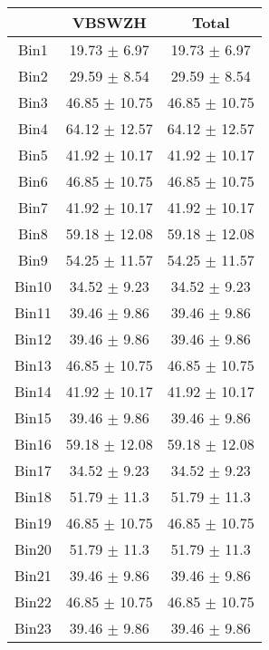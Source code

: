   \begin{tabular}{|c|c|c|}
  \hline
      & VBSWZH & Total \\ \cline{1-3} 
     \hline\hline
     Bin1 & 19.73 $\pm$ 6.97 & 19.73 $\pm$ 6.97 \\ \cline{1-3} 
     Bin2 & 29.59 $\pm$ 8.54 & 29.59 $\pm$ 8.54 \\ \cline{1-3} 
     Bin3 & 46.85 $\pm$ 10.75 & 46.85 $\pm$ 10.75 \\ \cline{1-3} 
     Bin4 & 64.12 $\pm$ 12.57 & 64.12 $\pm$ 12.57 \\ \cline{1-3} 
     Bin5 & 41.92 $\pm$ 10.17 & 41.92 $\pm$ 10.17 \\ \cline{1-3} 
     Bin6 & 46.85 $\pm$ 10.75 & 46.85 $\pm$ 10.75 \\ \cline{1-3} 
     Bin7 & 41.92 $\pm$ 10.17 & 41.92 $\pm$ 10.17 \\ \cline{1-3} 
     Bin8 & 59.18 $\pm$ 12.08 & 59.18 $\pm$ 12.08 \\ \cline{1-3} 
     Bin9 & 54.25 $\pm$ 11.57 & 54.25 $\pm$ 11.57 \\ \cline{1-3} 
     Bin10 & 34.52 $\pm$ 9.23 & 34.52 $\pm$ 9.23 \\ \cline{1-3} 
     Bin11 & 39.46 $\pm$ 9.86 & 39.46 $\pm$ 9.86 \\ \cline{1-3} 
     Bin12 & 39.46 $\pm$ 9.86 & 39.46 $\pm$ 9.86 \\ \cline{1-3} 
     Bin13 & 46.85 $\pm$ 10.75 & 46.85 $\pm$ 10.75 \\ \cline{1-3} 
     Bin14 & 41.92 $\pm$ 10.17 & 41.92 $\pm$ 10.17 \\ \cline{1-3} 
     Bin15 & 39.46 $\pm$ 9.86 & 39.46 $\pm$ 9.86 \\ \cline{1-3} 
     Bin16 & 59.18 $\pm$ 12.08 & 59.18 $\pm$ 12.08 \\ \cline{1-3} 
     Bin17 & 34.52 $\pm$ 9.23 & 34.52 $\pm$ 9.23 \\ \cline{1-3} 
     Bin18 & 51.79 $\pm$ 11.3 & 51.79 $\pm$ 11.3 \\ \cline{1-3} 
     Bin19 & 46.85 $\pm$ 10.75 & 46.85 $\pm$ 10.75 \\ \cline{1-3} 
     Bin20 & 51.79 $\pm$ 11.3 & 51.79 $\pm$ 11.3 \\ \cline{1-3} 
     Bin21 & 39.46 $\pm$ 9.86 & 39.46 $\pm$ 9.86 \\ \cline{1-3} 
     Bin22 & 46.85 $\pm$ 10.75 & 46.85 $\pm$ 10.75 \\ \cline{1-3} 
     Bin23 & 39.46 $\pm$ 9.86 & 39.46 $\pm$ 9.86 \\ \cline{1-3} 

\end{tabular}
